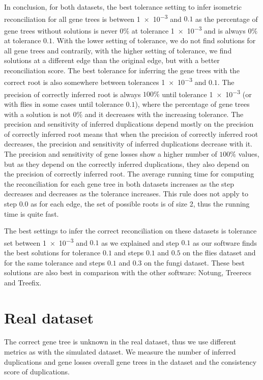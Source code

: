In conclusion, for both datasets, the best tolerance setting to infer isometric reconciliation for all gene trees is between \num{1e-3} and $0.1$ as the percentage of gene trees without solutions is never $0\%$ at tolerance \num{1e-3} and is always $0\%$ at tolerance $0.1$. With the lower setting of tolerance, we do not find solutions for all gene trees and contrarily, with the higher setting of tolerance, we find solutions at a different edge than the original edge, but with a better reconciliation score. The best tolerance for inferring the gene trees with the correct root is also somewhere between tolerances \num{1e-3} and $0.1$. The precision of correctly inferred root is always $100\%$ until tolerance \num{1e-3} (or with flies in some cases until tolerance $0.1$), where the percentage of gene trees with a solution is not $0\%$ and it decreases with the increasing tolerance. The precision and sensitivity of inferred duplications depend mostly on the precision of correctly inferred root means that when the precision of correctly inferred root decreases, the precision and sensitivity of inferred duplications decrease with it. The precision and sensitivity of gene losses show a higher number of $100\%$ values, but as they depend on the correctly inferred duplications, they also depend on the precision of correctly inferred root. The average running time for computing the reconciliation for each gene tree in both datasets increases as the step decreases and decreases as the tolerance increases. This rule does not apply to step $0.0$ as for each edge, the set of possible roots is of size 2, thus the running time is quite fast.

The best settings to infer the correct reconciliation on these datasets is tolerance set between \num{1e-3} and $0.1$ as we explained and step $0.1$ as our software finds the best solutions for tolerance $0.1$ and steps $0.1$ and $0.5$ on the flies dataset and for the same tolerance and steps $0.1$ and $0.3$ on the fungi dataset. These best solutions are also best in comparison with the other software: Notung, Treerecs and Treefix.


\section{Real dataset}

The correct gene tree is unknown in the real dataset, thus we use different metrics as with the simulated dataset. We measure the number of inferred duplications and gene losses overall gene trees in the dataset and the consistency score of duplications.

